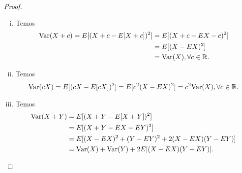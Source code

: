 \documentclass[../Notas.tex]{subfiles}
\begin{document}
\begin{proof}
\begin{itemize}
\begin{enumerate}[(i)]
        \item Temos
        \begin{align*}
            \text{Var}(X+c) = E[(X+c - E[X+c])^2] &= E[(X + c - EX - c)^2] \\
            &= E[(X-EX)^2] \\
            &= \text{Var}(X), \forall c\in\mathbb{R}.
        \end{align*}
        
        \item Temos
        \begin{align*}
            \text{Var}(cX) = E[(cX - E[cX])^2] = E[c^2(X-EX)^2] = c^2\text{Var}(X), \forall c\in\mathbb{R}.
        \end{align*}
        
        \item Temos
        \begin{align*}
            \text{Var}(X+Y) &= E[(X+Y - E[X+Y])^2] \\
            &= E[(X+Y-EX-EY)^2] \\
            &= E[(X-EX)^2 + (Y-EY)^2 + 2(X-EX)(Y-EY)] \\
            &= \text{Var}(X) + \text{Var}(Y) +2E[(X-EX)(Y-EY)].
        \end{align*}
    \end{enumerate}
\end{itemize}
\end{proof}
\end{document}
